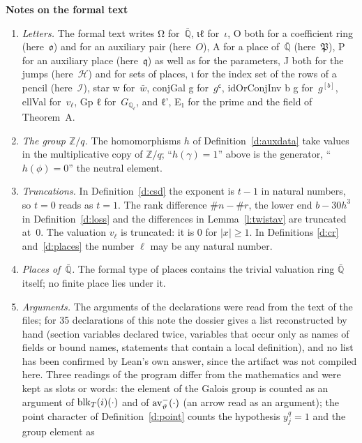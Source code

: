 \documentclass[11pt,a4paper]{article}
\newcommand{\leanfont}{\ttfamily\fontsize{8.6}{10.5}\selectfont\color{leancol}}
\newcommand{\m}[1]{\mbox{$#1$}}        %
\newcommand{\sect}[2]{\refstepcounter{section}\label{#2}\par\addvspace{19pt plus 4pt minus 2pt}\Needspace{7\baselineskip}%
  \noindent\llap{{\fontsize{13.2}{16}\selectfont\bfseries\color{inkfaint}\thesection}\hspace{9pt}}%
  {\fontsize{13.2}{16}\selectfont\bfseries\color{ink}#1}\par\nopagebreak\vspace{-1pt}}
\theoremstyle{plainx}
\theoremstyle{uprightx}
\newcommand{\Qb}{\bar{\mathbb{Q}}}
\newcommand{\Gl}{G_{\mathbb{Q}_\ell}}
\newcommand{\vl}{v_\ell}
\newcommand{\cj}[1]{\bar{#1}}
\newcommand{\fo}{\mathfrak{o}}
\newcommand{\fP}{\mathfrak{P}}
\newcommand{\fq}{\mathfrak{q}}
\newcommand{\HT}{\mathcal{H}}
\begin{document}
\sect{Notes on the formal text}{s:notes}
\begin{enumerate}[label=\textup{\arabic*.},leftmargin=1.6em,itemsep=5pt]
\item \emph{Letters.} The formal text writes {\leanfont Ω} for~\m{\Qb}, {\leanfont ιℓ} for~$\iota$, {\leanfont O}
both for a coefficient ring (here~$\fo$) and for an auxiliary pair (here~$O$), {\leanfont A} for a place
of~\m{\Qb} (here~$\fP$), {\leanfont P} for an auxiliary place (here~$\fq$) as well as for the parameters,
{\leanfont J} both for the jumps (here~$\HT$) and for sets of places, {\leanfont ι} for the index set of the rows
of a pencil (here~$\mathcal{I}$), {\leanfont star w} for~\m{\cj{w}}, {\leanfont conjGal g} for~\m{g^{\mathsf c}},
{\leanfont idOrConjInv b g} for~\m{g^{[b]}}, {\leanfont ellVal} for~\m{\vl}, {\leanfont Gp ℓ} for~\m{\Gl}, and
{\leanfont ℓ'}, {\leanfont E₁} for the prime and the field of Theorem~A.
\item \emph{The group \m{\mathbb{Z}/q}.} The homomorphisms $h$ of Definition~\ref{d:auxdata} take values in the
multiplicative copy of \m{\mathbb{Z}/q}; ``\m{h(\gamma)=1}'' above is the generator, ``\m{h(\phi)=0}'' the neutral
element.
\item \emph{Truncations.} In Definition~\ref{d:csd} the exponent is \m{t-1} in natural numbers, so \m{t=0} reads as
\m{t=1}. The rank difference \m{\#n-\#r}, the lower end \m{b-30h^3} in Definition~\ref{d:loss} and the differences in
Lemma~\ref{l:twistav} are truncated at~$0$. The valuation \m{\vl} is truncated: it is $0$ for \m{|x|\ge1}. In
Definitions \ref{d:cr} and~\ref{d:places} the number $\ell$ may be any natural number.
\item \emph{Places of~\m{\Qb}.} The formal type of places contains the trivial valuation ring \m{\Qb} itself; no
finite place lies under it.
\item \emph{Arguments.} The arguments of the declarations were read from the text of the files; for 35
declarations of this note the dossier gives a list reconstructed by hand (section variables declared twice,
variables that occur only as names of fields or bound names, statements that contain a local definition), and
no list has been confirmed by Lean's own answer, since the artifact was not compiled here. Three readings of
the program differ from the mathematics and were kept as slots or words: the element of the Galois group is
counted as an argument of \m{\blockRep{T}{i}{\cdot}} and of \m{\invAvatar{\vartheta}{\cdot}} (an arrow read as an argument);
the point character of Definition~\ref{d:point} counts the hypothesis \m{y_j^{q}=1} and the group element as

\end{enumerate}
\end{document}
